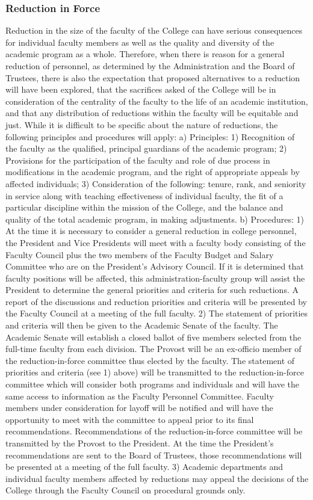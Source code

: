 \documentclass[letterpaper, 11pt]{article}
\begin{document}
		\subsubsection{Reduction in Force}
			Reduction in the size of the faculty of the College can have serious consequences for individual faculty members as well as the quality and diversity of the academic program as a whole.  Therefore, when there is reason for a general reduction of personnel, as determined by the Administration and the Board of Trustees, there is also the expectation that proposed alternatives to a reduction will have been explored, that the sacrifices asked of the College will be in consideration of the centrality of the faculty to the life of an academic institution, and that any distribution of reductions within the faculty will be equitable and just.  While it is difficult to be specific about the nature of reductions, the following principles and procedures will apply:
			a) Principles:
			1) Recognition of the faculty as the qualified, principal guardians of the academic program;
			2) Provisions for the participation of the faculty and role of due process in modifications in the academic program, and the right of appropriate appeals by affected individuals;
			3) Consideration of the following: tenure, rank, and seniority in service along with teaching effectiveness of individual faculty, the fit of a particular discipline within the mission of the College, and the balance and quality of the total academic program, in making adjustments.
			b) Procedures:
			1) At the time it is necessary to consider a general reduction in college personnel, the President and Vice Presidents will meet with a faculty body consisting of the Faculty Council plus the two members of the Faculty Budget and Salary Committee who are on the President's Advisory Council.  If it is determined that faculty positions will be affected, this administration-faculty group will assist the President to determine the general priorities and criteria for such reductions. A report of the discussions and reduction priorities and criteria will be presented by the Faculty Council at a meeting of the full faculty.
			2) The statement of priorities and criteria will then be given to the Academic Senate of the faculty.  The Academic Senate will establish a closed ballot of five members selected from the full-time faculty from each division.  The Provost will be an ex-officio member of the reduction-in-force committee thus elected by the faculty.  The statement of priorities and criteria (see 1) above) will be transmitted to the reduction-in-force committee which will consider both programs and individuals and will have the same access to information as the Faculty Personnel Committee.  Faculty members under consideration for layoff will be notified and will have the opportunity to meet with the committee to appeal prior to its final recommendations.  Recommendations of the reduction-in-force committee will be transmitted by the Provost to the President. At the time the President's recommendations are sent to the Board of Trustees, those recommendations will be presented at a meeting of the full faculty.
			3) Academic departments and individual faculty members affected by reductions may appeal the decisions of the College through the Faculty Council on procedural grounds only.
\end{document}
